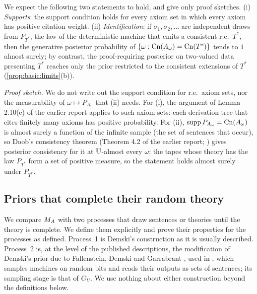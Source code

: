 \begin{remark}\label{rem:basic:generative}
We expect the following two statements to hold, and give only proof sketches. (i) \emph{Supports}: the support condition holds for every axiom set in which every axiom has positive citation weight. (ii) \emph{Identification}: if $\sigma_1,\sigma_2,\dots$ are independent draws from $P_{T^*}$, the law of the deterministic machine that emits a consistent r.e.\ $T^*$, then the generative posterior probability of $\{\omega:\mathrm{Cn}(A_\omega)=\mathrm{Cn}(T^*)\}$ tends to $1$ almost surely; by contrast, the proof-requiring posterior on two-valued data presenting $T^*$ reaches only the prior restricted to the consistent extensions of $T^*$ (\cref{prop:basic:limits}(b)).

\emph{Proof sketch.} We do not write out the support condition for r.e.\ axiom sets, nor the measurability of $\omega\mapsto P_{A_\omega}$ that (ii) needs. For (i), the argument of Lemma 2.10(c) of the earlier report applies to such axiom sets: each derivation tree that cites finitely many axioms has positive probability. For (ii), $\operatorname{supp} P_{A_\omega}=\mathrm{Cn}(A_\omega)$ is almost surely a function of the infinite sample (the set of sentences that occur), so Doob's consistency theorem (Theorem 4.2 of the earlier report; \citealp{doob1949application}) gives posterior consistency for it at $\mathbb{U}$-almost every $\omega$; the tapes whose theory has the law $P_{T^*}$ form a set of positive measure, so the statement holds almost surely under $P_{T^*}$.
\end{remark}

\subsection{Priors that complete their random theory}\label{app:basic:demski}

We compare $M_{A}$ with two processes that draw sentences or theories until the theory is complete. We define them explicitly and prove their properties for the processes as defined. Process~1 is Demski's construction \citep{demski2012logical} as it is usually described. Process~2 is, at the level of the published descriptions, the modification of Demski's prior due to Fallenstein, Demski and Garrabrant \citep{garrabrant2015modification}, used in \citet{garrabrant2016inductive}, which samples machines on random bits and reads their outputs as sets of sentences; its sampling stage is that of $G_U$. We use nothing about either construction beyond the definitions below.

